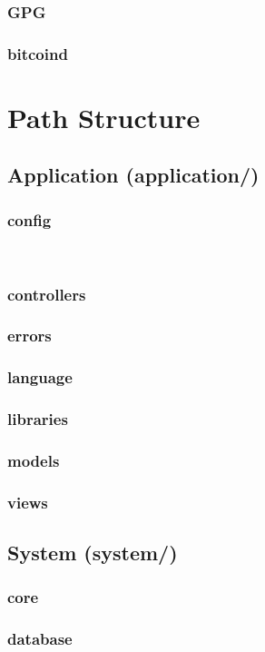 \documentclass[11pt]{article} %
\begin{document}
\subsubsection{GPG}
\subsubsection{bitcoind}
\newpage

\section{Path Structure}
\subsection{Application (application/)}
\subsubsection*{config}
\textbf{} \\
\subsubsection*{controllers}
\subsubsection*{errors}
\subsubsection*{language}
\subsubsection*{libraries}
\subsubsection*{models}
\subsubsection*{views}
\subsection{System (system/)}
\subsubsection*{core}
\subsubsection*{database}
\end{document}
